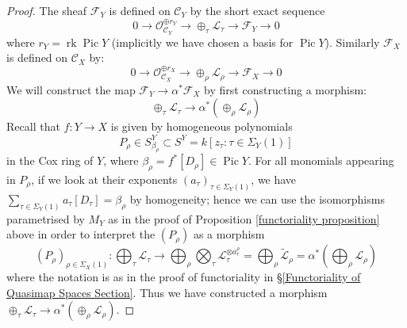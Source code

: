 \documentclass[11pt]{amsart}
\newcommand{\OO}{\mathcal{O}}
\renewcommand{\to}{\rightarrow}
\newcommand{\Pic}{\operatorname{Pic}}
\theoremstyle{definition}
\theoremstyle{definition}
\begin{document}
\begin{proof}
The sheaf $\mathcal{F}_Y$ is defined on $\mathcal{C}_Y$ by the short exact sequence
\begin{equation*} 0 \to \OO_{\mathcal{C}_Y}^{\oplus r_Y} \to \oplus_{\tau} \mathcal{L}_\tau \to \mathcal{F}_Y \to 0 \end{equation*}
where $r_Y = \operatorname{rk} \Pic Y$ (implicitly we have chosen a basis for $\Pic Y$). Similarly $\mathcal{F}_{X}$ is defined on $\mathcal{C}_{X}$ by:
\begin{equation*} 0 \to \OO_{\mathcal{C}_{X}}^{\oplus r_X} \to \oplus_{\rho} \mathcal{L}_\rho \to \mathcal{F}_{X} \to 0 \end{equation*}
We will construct the map $\mathcal{F}_Y \to \alpha^* \mathcal{F}_{X}$ by first constructing a morphism:
\begin{equation*} \oplus_{\tau} \mathcal{L}_\tau \to \alpha^* (\oplus_{\rho} \mathcal{L}_\rho) \end{equation*}
Recall that $f\colon Y\to X$ is given by homogeneous polynomials
\begin{equation*} P_\rho \in S^Y_{\beta_\rho} \subset S^Y = k[z_\tau : \tau \in \Sigma_Y(1)] \end{equation*}
in the Cox ring of $Y$, where $\beta_{\rho}=f^*[D_\rho] \in \Pic Y$. For all monomials appearing in $P_\rho$, if we look at their exponents $(a_{\tau})_{\tau\in\Sigma_Y(1)}$, we have $\sum_{\tau\in\Sigma_Y(1)}a_\tau[D_\tau]=\beta_\rho$ by homogeneity; hence we can use the isomorphisms parametrised by $M_Y$ as in the proof of Proposition \ref{functoriality proposition} above in order to interpret the $(P_\rho)$ as a morphism
\begin{equation*} (P_\rho)_{\rho\in\Sigma_X(1)}\colon \bigoplus_{\tau} \mathcal{L}_{\tau} \to \bigoplus_{\rho} \bigotimes_{\tau} \mathcal{L}_\tau^{\otimes a_\tau^\rho} = \bigoplus_{\rho} \tilde{\mathcal{L}}_\rho = \alpha^* \left( \bigoplus_{\rho} \mathcal{L}_\rho \right) 
\end{equation*}
where the notation is as in the proof of functoriality in \S \ref{Functoriality of Quasimap Spaces Section}. Thus we have constructed a morphism $\oplus_{\tau} \mathcal{L}_\tau \to \alpha^* (\oplus_{\rho} \mathcal{L}_\rho)$.


\end{proof}
\end{document}
